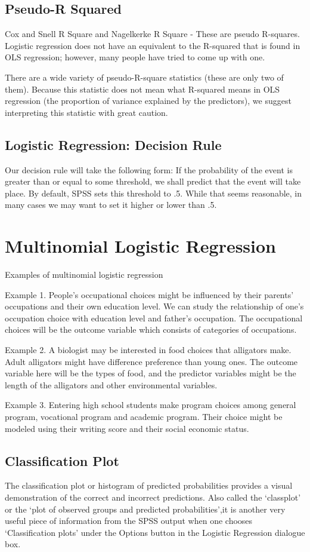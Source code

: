 \documentclass[a4paper,12pt]{article}
\begin{document}
\subsection{Pseudo-R Squared}
Cox  and Snell R Square and Nagelkerke R Square - These are pseudo R-squares.  Logistic regression does not have an equivalent to the R-squared that is found in OLS regression; however, many people have tried to come up with one.  

There are a wide variety of pseudo-R-square statistics (these are only two of them).  Because this statistic does not mean what R-squared means in OLS regression (the proportion of variance explained by the predictors), we suggest interpreting this statistic with great caution.
\newpage
\subsection{Logistic Regression: Decision Rule}
Our decision rule will take the following form: If the probability of the event is greater than or equal to some threshold, we shall predict that the event will take place. By default, SPSS sets this threshold to .5. While that seems reasonable, in many cases we may want to set it higher or lower than .5.

\section{Multinomial Logistic Regression}
Examples of multinomial logistic regression

Example 1. People's occupational choices might be influenced by their parents' occupations and their own education level. We can study the relationship of one's occupation choice with education level and father's occupation.  The occupational choices will be the outcome variable which consists of categories of occupations.

Example 2. A biologist may be interested in food choices that alligators make. Adult alligators might have difference preference than young ones. The outcome variable here will be the types of food, and the predictor variables might be the length of the alligators and other environmental variables.

Example 3. Entering high school students make program choices among general program, vocational program and academic program. Their choice might be modeled using their writing score and their social economic status.

\subsection{Classification Plot} 
The classification plot or histogram of predicted probabilities
provides a visual demonstration of the correct and incorrect predictions. Also called the ‘classplot’ or the ‘plot of observed groups and predicted probabilities’,it is another very useful piece of information from the SPSS output when one chooses
‘Classification plots’ under the Options button in the Logistic Regression dialogue box.
\end{document}
